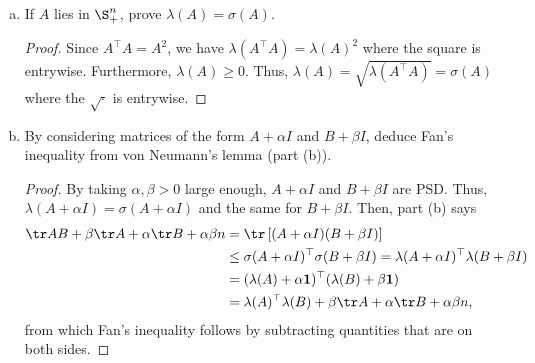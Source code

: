 \documentclass[../borwein-lewis_notes.tex]{subfiles}
\begin{document}
\begin{enumerate}[(a)]
\begin{equation*}
\tr(A^\top B) \leq \sigma(A)^\top\sigma(B).
\end{equation*}
\begin{proof}
We apply Fan's inequality to the matrices below.
\begin{equation*}
2\tr(A^\top B) = \tr\left(\begin{bmatrix} 0 & A^\top \\ A & 0 \end{bmatrix}
\begin{bmatrix} 0 & B^\top \\ B & 0 \end{bmatrix}\right)
\leq \begin{bmatrix} \sigma(A) \\ [-\sigma(A)]\end{bmatrix}^\top 
\begin{bmatrix} \sigma(B) \\ [-\sigma(B)]\end{bmatrix} = 2\sigma(A)^\top
\sigma(B).
\end{equation*}
\end{proof}
\item If $A$ lies in $\S_+^n$, prove $\lambda(A)=\sigma(A)$.
\begin{proof}
Since $A^\top A = A^2$, we have $\lambda(A^\top A) = \lambda(A)^2$ 
where the square is entrywise. Furthermore, $\lambda(A)\geq 0$. 
Thus, $\lambda(A)=\sqrt{\lambda(A^\top A)} = \sigma(A)$ where the 
$\sqrt{\cdot}$ is entrywise.
\end{proof}
\item By considering matrices of the form $A+\alpha I$ and $B+\beta I$, 
deduce Fan's inequality from von Neumann's lemma (part (b)).
\begin{proof}
By taking $\alpha,\beta > 0$ large enough, $A+\alpha I$ and 
$B + \beta I$ are PSD. Thus, $\lambda(A+\alpha I) = \sigma(A+\alpha I)$ 
and the same for $B + \beta I$. Then, part (b) says 
\begin{align*}
\tr AB + \beta \tr A + 
\alpha\tr B + \alpha\beta n&=  \tr\left[(A+\alpha I)(B+\beta I)\right] \\
&\leq \sigma(A+\alpha I)^\top \sigma(B+\beta I) = \lambda(A + \alpha I)^{
\top}\lambda(B+\beta I) \\
&= (\lambda(A) + \alpha\mathbf 1)^\top(\lambda(B) + \beta\mathbf 1)\\
&= \lambda(A)^\top\lambda(B) + \beta\tr A + \alpha\tr B + \alpha\beta n,
\end{align*}
from which Fan's inequality follows by subtracting 
quantities that are on both sides.
\end{proof}
\end{enumerate}
\end{document}
